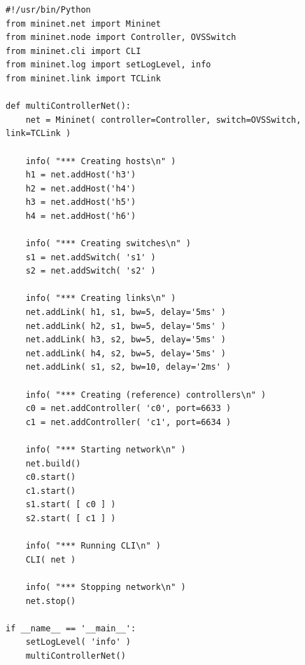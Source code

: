 \begin{minipage}{\linewidth}
\begin{lstlisting}[label=lst:activity-1-script, caption=the complete Python script required for Activity 1]
#!/usr/bin/Python
from mininet.net import Mininet
from mininet.node import Controller, OVSSwitch
from mininet.cli import CLI
from mininet.log import setLogLevel, info
from mininet.link import TCLink

def multiControllerNet():
    net = Mininet( controller=Controller, switch=OVSSwitch, link=TCLink )

    info( "*** Creating hosts\n" )
    h1 = net.addHost('h3')
    h2 = net.addHost('h4')
    h3 = net.addHost('h5')
    h4 = net.addHost('h6')

    info( "*** Creating switches\n" )
    s1 = net.addSwitch( 's1' )
    s2 = net.addSwitch( 's2' )

    info( "*** Creating links\n" )
    net.addLink( h1, s1, bw=5, delay='5ms' )
    net.addLink( h2, s1, bw=5, delay='5ms' )
    net.addLink( h3, s2, bw=5, delay='5ms' )
    net.addLink( h4, s2, bw=5, delay='5ms' )
    net.addLink( s1, s2, bw=10, delay='2ms' )

    info( "*** Creating (reference) controllers\n" )
    c0 = net.addController( 'c0', port=6633 )
    c1 = net.addController( 'c1', port=6634 )

    info( "*** Starting network\n" )
    net.build()
    c0.start()
    c1.start()
    s1.start( [ c0 ] )
    s2.start( [ c1 ] )

    info( "*** Running CLI\n" )
    CLI( net )

    info( "*** Stopping network\n" )
    net.stop()

if __name__ == '__main__':
    setLogLevel( 'info' )
    multiControllerNet()
\end{lstlisting}
\end{minipage}
